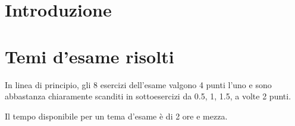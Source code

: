 \providecommand{\main}{.}



\def\reqFeaReg{Draw the feasible region in the $x_1-x_2$ axis and $f_1-f_2$.}
\newcommand{\reqParetReg}[1]{Determine the paretian region with the \textit{#1}.}
\newcommand{\reqPareStd}[1]{
	Consider the given problem of mathematical programming:
	\begin{enumerate}[a)]
		\item \reqFeaReg
		\item \reqParetReg{#1}
	\end{enumerate}
}

\newcommand{\fesReg}[1]{
	\fig{
		\texttt{[image: pareto/\#1/regx]}
		\caption{Feasible region in $x_1-x_2$}
	}{
		\texttt{[image: pareto/\#1/regf]}
		\caption{Feasible region in $f_1-f_2$}
	}[1]{\caption{Feasible regions}}
}




{\hypersetup{hidelinks}
	\tableofcontents  %
}

\chapter{Introduzione}

\clearpage

\clearpage

\clearpage

\clearpage

\clearpage

\clearpage

\clearpage

\clearpage


\appendix


\chapter{Temi d'esame risolti}

In linea di principio, gli 8 esercizi dell'esame valgono 4 punti l'uno e sono abbastanza chiaramente scanditi in sottoesercizi da 0.5, 1, 1.5, a volte 2 punti.

Il tempo disponibile per un tema d'esame è di 2 ore e mezza.


\clearpage

\clearpage

\clearpage

\clearpage

\clearpage




